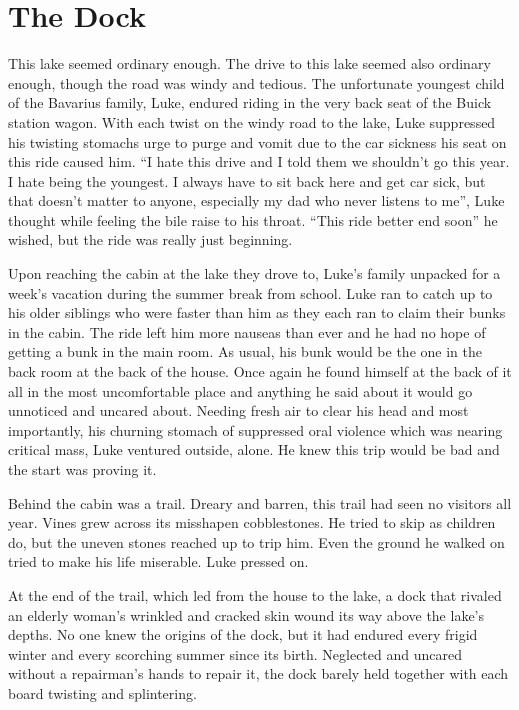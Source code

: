 \chapter{The Dock}



This lake seemed ordinary enough. The drive to this lake seemed
also ordinary enough, though the road was windy and tedious. The
unfortunate youngest child of the Bavarius family, Luke, endured
riding in the very back seat of the Buick station wagon. With each
twist on the windy road to the lake, Luke suppressed his twisting
stomachs urge to purge and vomit due to the car sickness his seat
on this ride caused him. ``I hate this drive and I told them
we shouldn't go this year. I hate being the youngest. I
always have to sit back here and get car sick, but that
doesn't matter to anyone, especially my dad who never listens
to me'', Luke thought while feeling the bile raise to his
throat. ``This ride better end soon'' he wished, but the
ride was really just beginning.



Upon reaching the cabin at the lake they drove to, Luke's
family unpacked for a week's vacation during the summer break
from school. Luke ran to catch up to his older siblings who were
faster than him as they each ran to claim their bunks in the cabin.
The ride left him more nauseas than ever and he had no hope of
getting a bunk in the main room. As usual, his bunk would be the
one in the back room at the back of the house. Once again he found
himself at the back of it all in the most uncomfortable place and
anything he said about it would go unnoticed and uncared about.
Needing fresh air to clear his head and most importantly, his
churning stomach of suppressed oral violence which was nearing
critical mass, Luke ventured outside, alone. He knew this trip
would be bad and the start was proving it.



Behind the cabin was a trail. Dreary and barren, this trail had
seen no visitors all year. Vines grew across its misshapen
cobblestones. He tried to skip as children do, but the uneven
stones reached up to trip him. Even the ground he walked on tried
to make his life miserable. Luke pressed on.



At the end of the trail, which led from the house to the lake, a
dock that rivaled an elderly woman's wrinkled and cracked
skin wound its way above the lake's depths. No one knew the
origins of the dock, but it had endured every frigid winter and
every scorching summer since its birth. Neglected and uncared
without a repairman's hands to repair it, the dock barely
held together with each board twisting and splintering.



